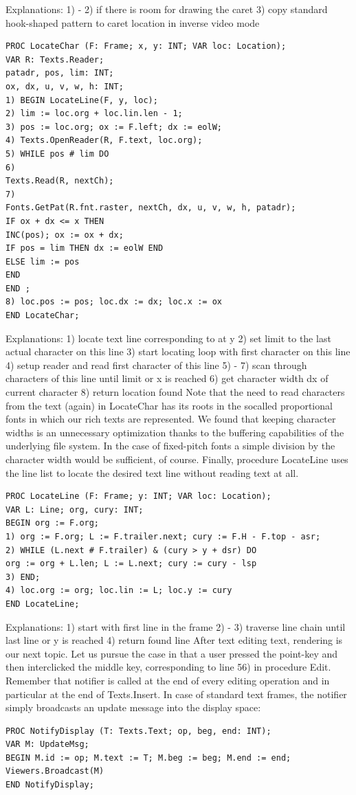 Explanations:
1) - 2) if there is room for drawing the caret
3) copy standard hook-shaped pattern to caret location in inverse video mode
\begin{verbatim}
PROC LocateChar (F: Frame; x, y: INT; VAR loc: Location);
VAR R: Texts.Reader;
patadr, pos, lim: INT;
ox, dx, u, v, w, h: INT;
1) BEGIN LocateLine(F, y, loc);
2) lim := loc.org + loc.lin.len - 1;
3) pos := loc.org; ox := F.left; dx := eolW;
4) Texts.OpenReader(R, F.text, loc.org);
5) WHILE pos # lim DO
6)
Texts.Read(R, nextCh);
7)
Fonts.GetPat(R.fnt.raster, nextCh, dx, u, v, w, h, patadr);
IF ox + dx <= x THEN
INC(pos); ox := ox + dx;
IF pos = lim THEN dx := eolW END
ELSE lim := pos
END
END ;
8) loc.pos := pos; loc.dx := dx; loc.x := ox
END LocateChar;
\end{verbatim}
Explanations:
1) locate text line corresponding to at y
2) set limit to the last actual character on this line
3) start locating loop with first character on this line
4) setup reader and read first character of this line
5) - 7) scan through characters of this line until limit or x is reached
6) get character width dx of current character
8) return location found
Note that the need to read characters from the text (again) in LocateChar has its roots in the socalled proportional fonts in which our rich texts are represented. We found that keeping character
widths is an unnecessary optimization thanks to the buffering capabilities of the underlying file
system. In the case of fixed-pitch fonts a simple division by the character width would be sufficient,
of course.
Finally, procedure LocateLine uses the line list to locate the desired text line without reading text at
all.
\begin{verbatim}
PROC LocateLine (F: Frame; y: INT; VAR loc: Location);
VAR L: Line; org, cury: INT;
BEGIN org := F.org;
1) org := F.org; L := F.trailer.next; cury := F.H - F.top - asr;
2) WHILE (L.next # F.trailer) & (cury > y + dsr) DO
org := org + L.len; L := L.next; cury := cury - lsp
3) END;
4) loc.org := org; loc.lin := L; loc.y := cury
END LocateLine;
\end{verbatim}

Explanations:
1) start with first line in the frame
2) - 3) traverse line chain until last line or y is reached
4) return found line
After text editing text, rendering is our next topic. Let us pursue the case in that a user pressed the
point-key and then interclicked the middle key, corresponding to line 56) in procedure Edit.
Remember that notifier is called at the end of every editing operation and in particular at the end of
Texts.Insert. In case of standard text frames, the notifier simply broadcasts an update message into
the display space:
\begin{verbatim}
PROC NotifyDisplay (T: Texts.Text; op, beg, end: INT);
VAR M: UpdateMsg;
BEGIN M.id := op; M.text := T; M.beg := beg; M.end := end; Viewers.Broadcast(M)
END NotifyDisplay;
\end{verbatim}

